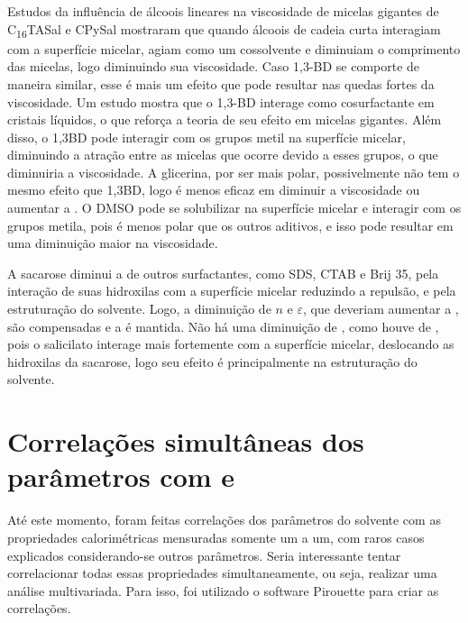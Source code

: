 		Estudos da influência de álcoois lineares na viscosidade de micelas gigantes de C\textsubscript{16}TASal e CPySal mostraram que quando álcoois de cadeia curta interagiam com a superfície micelar, agiam como um cossolvente e diminuiam o comprimento das micelas, logo diminuindo sua viscosidade. Caso 1,3-BD se comporte de maneira similar, esse é mais um efeito que pode resultar nas quedas fortes da viscosidade. Um estudo mostra que o 1,3-BD interage como cosurfactante em cristais líquidos, o que reforça a teoria de seu efeito em micelas gigantes. Além disso, o 1,3BD pode interagir com os grupos metil na superfície micelar, diminuindo a atração entre as micelas que ocorre devido a esses grupos, o que diminuiria a viscosidade. A glicerina, por ser mais polar, possivelmente não tem o mesmo efeito que 1,3BD, logo é menos eficaz em diminuir a viscosidade ou aumentar a \cmc. O DMSO pode se solubilizar na superfície micelar e interagir com os grupos metila, pois é menos polar que os outros aditivos, e isso pode resultar em uma diminuição maior na viscosidade. 
		
		
		A sacarose diminui a \cmc{} de outros surfactantes, como SDS, CTAB e Brij 35, pela interação de suas hidroxilas com a superfície micelar reduzindo a repulsão, e pela estruturação do solvente. Logo, a diminuição de \(n\) e \(\varepsilon\), que deveriam aumentar a \cwlm{}, são compensadas e a \cwlm{} é mantida. Não há uma diminuição de \cwlm, como houve de \cmc, pois o salicilato interage mais fortemente com a superfície micelar, deslocando as hidroxilas da sacarose, logo seu efeito é principalmente na estruturação do solvente.

		\section{Correlações simultâneas dos parâmetros com \cmc{} e \DHmic}
		
		
		Até este momento, foram feitas correlações dos parâmetros do solvente com as propriedades calorimétricas mensuradas somente um a um, com raros casos explicados considerando-se outros parâmetros. Seria interessante tentar correlacionar todas essas propriedades simultaneamente, ou seja, realizar uma análise multivariada. Para isso, foi utilizado o software Pirouette para criar as correlações.
		
